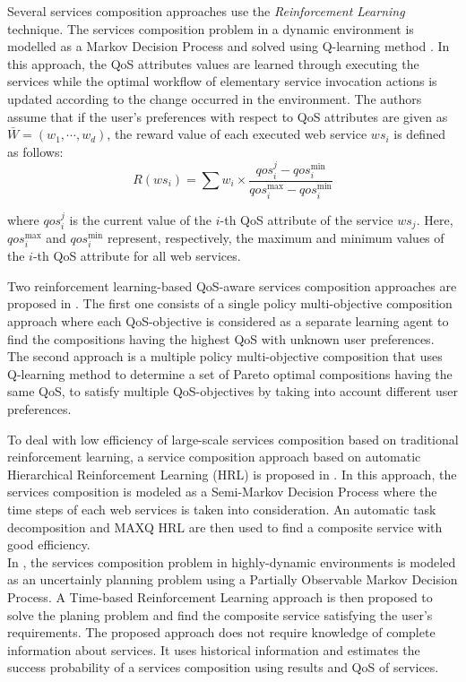 \documentclass[10pt,journal,compsoc]{IEEEtran}
\begin{document}
Several services composition approaches use the \textit{Reinforcement Learning} technique. The services composition problem in a dynamic environment is modelled as a Markov Decision Process and solved using Q-learning method \cite{Wang2010}. In this approach, the QoS attributes values are learned through executing the services while the optimal workflow of elementary service invocation actions is updated according to the change occurred in the environment. The authors assume that if the user's preferences with respect to QoS attributes are given as $\bar{W} = (w_1, \cdots, w_d)$, the reward value of each executed web service $ws_i$ is defined as follows: 
\begin{equation}
R(ws_i) = \sum w_i \times \frac{qos_i^j - qos_i^{\text{min}}}{qos_i^{\text{max}}-qos_i^{\text{min}}}
\end{equation}

\noindent where $qos_i^j$ is the current value of the $i$-th QoS attribute of the service $ws_j$. Here, $qos_i^{\text{max}}$ and $qos_i^{\text{min}}$ represent, respectively, the maximum and minimum values of the $i$-th QoS attribute for all web services.

Two reinforcement learning-based QoS-aware services composition approaches are proposed in \cite{Mostafa2015}. The first one consists of a single policy multi-objective composition approach where each QoS-objective is considered as a separate learning agent to find the compositions having the highest QoS with unknown user preferences. The second approach is a multiple policy multi-objective composition that uses Q-learning method to determine a set of Pareto optimal compositions having the same QoS, to satisfy multiple QoS-objectives by taking into account different user preferences. 

To deal with low efficiency of large-scale services composition based on traditional reinforcement learning, a service composition approach based on automatic Hierarchical Reinforcement Learning (HRL) is proposed in \cite{wang2016automatic}. In this approach, the services composition is modeled as a Semi-Markov Decision Process where the time steps of each web services is taken into consideration. An automatic task decomposition and MAXQ HRL are then used to find a composite service with good efficiency.\\

In \cite{lei2015web}, the services composition problem in highly-dynamic environments is modeled as an uncertainly planning problem using a Partially Observable Markov Decision Process. A Time-based Reinforcement Learning approach is then proposed to solve the planing problem and find the composite service satisfying the user's requirements. The proposed approach does not require knowledge of complete information about services. It uses historical information and estimates the success probability of a services composition using results and QoS of services.\\
\end{document}
